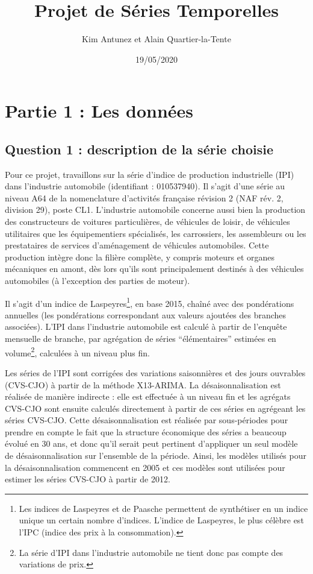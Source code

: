 \documentclass[,french]{article}
\title{Projet de Séries Temporelles}
\author{Kim Antunez et Alain Quartier-la-Tente}
\date{19/05/2020}
\begin{document}
\maketitle

{
\hypersetup{linkcolor=}
\setcounter{tocdepth}{3}
\tableofcontents
}
\thispagestyle{empty}
\newpage\setcounter{page}{1}

\hypertarget{partie-1-les-donnuxe9es}{%
\section{Partie 1 : Les données}\label{partie-1-les-donnuxe9es}}

\hypertarget{question-1-description-de-la-suxe9rie-choisie}{%
\subsection{Question 1 : description de la série choisie}\label{question-1-description-de-la-suxe9rie-choisie}}

Pour ce projet, travaillons sur la série d'indice de production industrielle (IPI) dans l'industrie automobile (identifiant : 010537940).
Il s'agit d'une série au niveau A64 de la nomenclature d'activités française révision 2 (NAF rév. 2, division 29), poste CL1.
L'industrie automobile concerne aussi bien la production des constructeurs de voitures particulières, de véhicules de loisir, de véhicules utilitaires que les équipementiers spécialisés, les carrossiers, les assembleurs ou les prestataires de services d'aménagement de véhicules automobiles.
Cette production intègre donc la filière complète, y compris moteurs et organes mécaniques en amont, dès lors qu'ils sont principalement destinés à des véhicules automobiles (à l'exception des parties de moteur).

Il s'agit d'un indice de Laspeyres\footnote{Les indices de Laspeyres et de Paasche permettent de synthétiser en un indice unique un certain nombre d'indices. L'indice de Laspeyres, le plus célèbre est l'IPC (indice des prix à la consommation).}, en base 2015, chaîné avec des pondérations annuelles (les pondérations correspondant aux valeurs ajoutées des branches associées).
L'IPI dans l'industrie automobile est calculé à partir de l'enquête mensuelle de branche, par agrégation de séries ``élémentaires'' estimées en volume\footnote{La série d'IPI dans l'industrie automobile ne tient donc pas compte des variations de prix.}, calculées à un niveau plus fin.

Les séries de l'IPI sont corrigées des variations saisonnières et des jours ouvrables (CVS-CJO) à partir de la méthode X13-ARIMA.
La désaisonnalisation est réalisée de manière indirecte : elle est effectuée à un niveau fin et les agrégats CVS-CJO sont ensuite calculés directement à partir de ces séries en agrégeant les séries CVS-CJO.
Cette désaisonnalisation est réalisée par sous-périodes pour prendre en compte le fait que la structure économique des séries a beaucoup évolué en 30 ans, et donc qu'il serait peut pertinent d'appliquer un seul modèle de désaisonnalisation sur l'ensemble de la période.
Ainsi, les modèles utilisés pour la désaisonnalisation commencent en 2005 et ces modèles sont utilisées pour estimer les séries CVS-CJO à partir de 2012.
\end{document}
